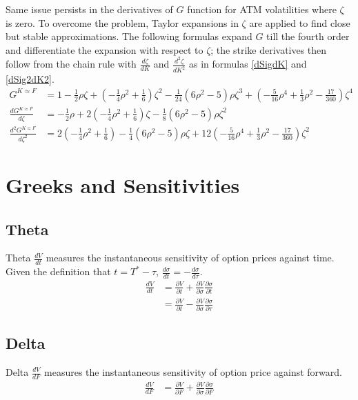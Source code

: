 \documentclass{article}
\begin{document}
Same issue persists in the derivatives of $ G $ function for ATM volatilities where $ \zeta $ is zero.
To overcome the problem, Taylor expansions in $ \zeta $ are applied to find close but stable approximations.
The following formulas expand $ G $ till the fourth order and differentiate the expansion with respect to $ \zeta $; the strike derivatives then follow from the chain rule with $ \frac{d \zeta}{d K} $ and $ \frac{d^2 \zeta}{d K^2} $ as in formulas \ref{dSigdK} and \ref{dSig2dK2}.
\begin{subequations}
    \begin{align}
        G^{K \approx F} &= 1 - \frac{1}{2} \rho \zeta + \left(-\frac{1}{4} \rho^2 + \frac{1}{6}\right) \zeta^2 - \frac{1}{24} \left(6 \rho^2 - 5\right) \rho \zeta^3 + \left(-\frac{5}{16} \rho^4 + \frac{1}{3} \rho^2 - \frac{17}{360}\right) \zeta^4 \\
        \frac{d G^{K \approx F}}{d \zeta} &= -\frac{1}{2} \rho  + 2 \left(-\frac{1}{4} \rho^2 + \frac{1}{6}\right) \zeta - \frac{1}{8} \left(6 \rho^2 - 5\right) \rho \zeta^2 \\
        \frac{d^2 G^{K \approx F}}{d \zeta^2} &= 2 \left(-\frac{1}{4} \rho^2 + \frac{1}{6}\right) - \frac{1}{4} \left(6 \rho^2 - 5\right) \rho \zeta + 12 \left(-\frac{5}{16} \rho^4 + \frac{1}{3} \rho^2 - \frac{17}{360}\right) \zeta^2
    \end{align}
\end{subequations}


\section{Greeks and Sensitivities}

\subsection{Theta}
Theta $ \frac{d V}{d t} $ measures the instantaneous sensitivity of option prices against time. Given the definition that $ t = T^* - \tau $, $ \frac{d \sigma}{d t} = -\frac{d \sigma}{d \tau}$.
\begin{align}
    \frac{d V}{d t} &= \frac{\partial V}{\partial t} + \frac{\partial V}{\partial \sigma} \frac{\partial \sigma}{\partial t} \nonumber \\
    &= \frac{\partial V}{\partial t} - \frac{\partial V}{\partial \sigma} \frac{\partial \sigma}{\partial \tau}
\end{align}

\subsection{Delta}
Delta $ \frac{d V}{d F} $ measures the instantaneous sensitivity of option price against forward.
\begin{align}
    \frac{d V}{d F} &= \frac{\partial V}{\partial F} + \frac{\partial V}{\partial \sigma} \frac{\partial \sigma}{\partial F}
\end{align}
\end{document}
